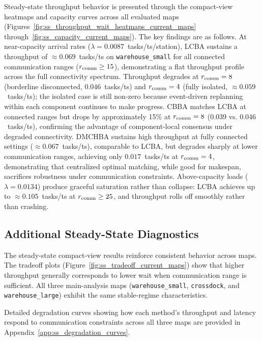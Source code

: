 Steady-state throughput behavior is presented through the compact-view
heatmaps and capacity curves across all evaluated maps
(Figures~\ref{fig:ss_throughput_wait_heatmaps_current_maps}
through~\ref{fig:ss_capacity_current_maps}).
The key findings are as follows.
At near-capacity arrival rates ($\lambda = 0.0087$~tasks/ts/station),
LCBA sustains a throughput of $\approx 0.069$~tasks/ts on
\texttt{warehouse\_small} for all connected communication ranges
($r_{\text{comm}} \geq 15$), demonstrating a flat throughput profile across the
full connectivity spectrum.
Throughput degrades at $r_{\text{comm}} = 8$ (borderline disconnected, $0.046$~tasks/ts)
and $r_{\text{comm}} = 4$ (fully isolated, $\approx 0.059$~tasks/ts); the isolated
case is still non-zero because event-driven replanning within each component
continues to make progress.
CBBA matches LCBA at connected ranges but drops by approximately 15\% at
$r_{\text{comm}} = 8$ ($0.039$ vs. $0.046$~tasks/ts), confirming the advantage of
component-local consensus under degraded connectivity.
DMCHBA sustains high throughput at fully connected settings ($\approx 0.067$~tasks/ts),
comparable to LCBA, but degrades sharply at lower communication ranges, achieving only
$0.017$~tasks/ts at $r_{\text{comm}} = 4$, demonstrating that centralized optimal matching, while
good for makespan, sacrifices robustness under communication constraints.
Above-capacity loads ($\lambda = 0.0134$) produce graceful saturation rather
than collapse: LCBA achieves up to $\approx 0.105$~tasks/ts at $r_{\text{comm}} \geq 25$,
and throughput rolls off smoothly rather than crashing.

\subsection{Additional Steady-State Diagnostics}
\label{subsec:exp_ss_diagnostics}

The steady-state compact-view results reinforce consistent behavior across maps.
The tradeoff plots (Figure~\ref{fig:ss_tradeoff_current_maps}) show that higher throughput generally corresponds to lower wait
when communication range is sufficient.
All three main-analysis maps (\texttt{warehouse\_small}, \texttt{crossdock},
and \texttt{warehouse\_large}) exhibit the same stable-regime characteristics.

Detailed degradation curves showing how each method's throughput and latency respond
to communication constraints across all three maps are provided in
Appendix~\ref{app:ss_degradation_curves}.

